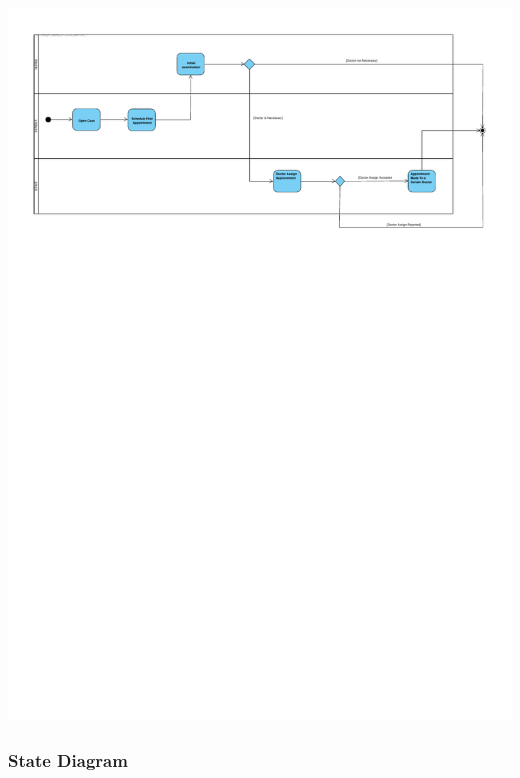 \documentclass[a4paper, 12pt, titlepage]{article}
\begin{document}
  \includegraphics[width=\linewidth]{activity_diag_appointment} %

  \subsubsection{State Diagram}
\end{document}
